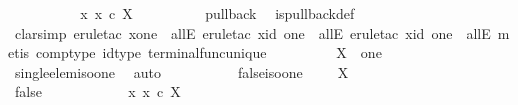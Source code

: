 \begin{isabellebody}
\ \ \ \ \ \ \isamarkupfalse%
\ \isamarkupfalse%
\ {\isachardoublequoteopen}{\isasymexists}{\isacharbang}{\kern0pt}\ x{\isachardot}{\kern0pt}\ x\ {\isasymin}\isactrlsub c\ X{\isachardoublequoteclose}\isanewline
\ \ \ \ \ \ \ \ \isamarkupfalse%
\ {\isasymchi}{\isacharunderscore}{\kern0pt}pullback\ \isamarkupfalse%
\ is{\isacharunderscore}{\kern0pt}pullback{\isacharunderscore}{\kern0pt}def\ \ \ \ \ \ \ \ \ \isanewline
\ \ \ \ \ \ \ \ \isamarkupfalse%
\ {\isacharparenleft}{\kern0pt}clarsimp{\isacharcomma}{\kern0pt}\ {\isacharparenleft}{\kern0pt}erule{\isacharunderscore}{\kern0pt}tac\ x{\isacharequal}{\kern0pt}one\ \ allE{\isacharcomma}{\kern0pt}\ erule{\isacharunderscore}{\kern0pt}tac\ x{\isacharequal}{\kern0pt}{\isachardoublequoteopen}id\ one{\isachardoublequoteclose}\ \ allE{\isacharcomma}{\kern0pt}\ erule{\isacharunderscore}{\kern0pt}tac\ x{\isacharequal}{\kern0pt}{\isachardoublequoteopen}id\ one{\isachardoublequoteclose}\ \ allE{\isacharparenright}{\kern0pt}{\isacharcomma}{\kern0pt}\ metis\ comp{\isacharunderscore}{\kern0pt}type\ id{\isacharunderscore}{\kern0pt}type\ terminal{\isacharunderscore}{\kern0pt}func{\isacharunderscore}{\kern0pt}unique{\isacharparenright}{\kern0pt}\isanewline
\ \ \ \ \ \ \isamarkupfalse%
\ \isamarkupfalse%
\ {\isachardoublequoteopen}X\ {\isasymcong}\ one{\isachardoublequoteclose}\isanewline
\ \ \ \ \ \ \ \ \isamarkupfalse%
\ single{\isacharunderscore}{\kern0pt}elem{\isacharunderscore}{\kern0pt}iso{\isacharunderscore}{\kern0pt}one\ \isamarkupfalse%
\ auto\isanewline
\ \ \ \ \isamarkupfalse%
\isanewline
\isanewline
\ \ \ \ \isamarkupfalse%
\ false{\isacharunderscore}{\kern0pt}iso{\isacharunderscore}{\kern0pt}one{\isacharcolon}{\kern0pt}\ {\isachardoublequoteopen}{\isasymchi}\ {\isacharequal}{\kern0pt}\ {\isasymf}\ {\isasymLongrightarrow}\ X\ {\isasymcong}\ {\isasymemptyset}{\isachardoublequoteclose}\isanewline
\ \ \ \ \isamarkupfalse%
\ {\isacharminus}{\kern0pt}\isanewline
\ \ \ \ \ \ \isamarkupfalse%
\ {\isasymchi}{\isacharunderscore}{\kern0pt}false{\isacharcolon}{\kern0pt}\ {\isachardoublequoteopen}{\isasymchi}\ {\isacharequal}{\kern0pt}\ {\isasymf}{\isachardoublequoteclose}\isanewline
\ \ \ \ \ \ \isamarkupfalse%
\ {\isachardoublequoteopen}{\isasymnexists}\ x{\isachardot}{\kern0pt}\ x\ {\isasymin}\isactrlsub c\ X{\isachardoublequoteclose}\isanewline

\end{isabellebody}
